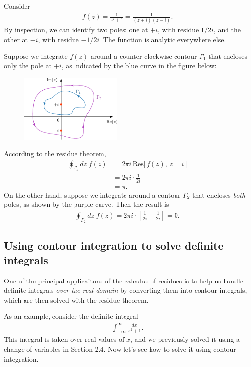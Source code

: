 \documentclass[10pt,a4paper]{article}
\begin{document}
Consider
\begin{align}
  f(z) = \frac{1}{z^2 + 1} = \frac{1}{(z + i)\,(z-i)}.
\end{align}
By inspection, we can identify two poles: one at $+i$, with residue
$1/2i$, and the other at $-i$, with residue $-1/2i$. The function is
analytic everywhere else.

Suppose we integrate $f(z)$ around a counter-clockwise contour
$\Gamma_1$ that encloses only the pole at $+i$, as indicated by the
blue curve in the figure below:

\begin{figure}[ht]
  \centering\includegraphics[width=0.45\textwidth]{contour_example1}
\end{figure}

\clearpage
According to the residue theorem,
\begin{align}
  \oint_{\Gamma_1}dz \; f(z) &= 2\pi i\, \mathrm{Res}\big[\,f(z),\,z = i\,\big] \\
  &= 2\pi i \cdot \frac{1}{2i} \\
  & = \pi.
\end{align}
On the other hand, suppose we integrate around a contour $\Gamma_2$
that encloses \textit{both} poles, as shown by the purple curve. Then
the result is
\begin{align}
  \oint_{\Gamma_2}dz \; f(z) = 2\pi i \cdot \left[\frac{1}{2i} - \frac{1}{2i}\right] = 0.
\end{align}

\subsection{Using contour integration to solve definite integrals}
\label{using-contours-to-solve-integrals}

One of the principal applicaitons of the calculus of residues is to
help us handle definite integrals \textit{over the real domain} by
converting them into contour integrals, which are then solved with the
residue theorem.

As an example, consider the definite integral
\begin{align}
  \int_{-\infty}^\infty \frac{dx}{x^2 + 1}.
\end{align}
This integral is taken over real values of $x$, and we previously
solved it using a change of variables in Section 2.4.  Now let's see
how to solve it using contour integration.
\end{document}
